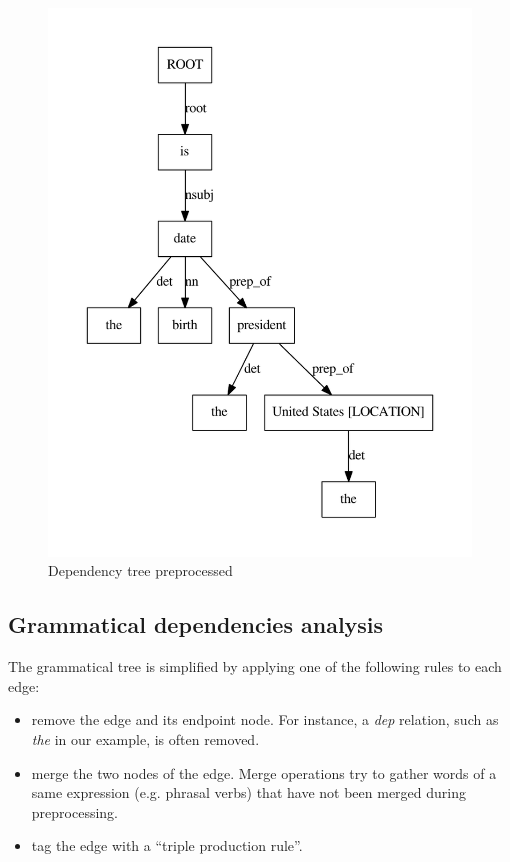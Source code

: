 \begin{figure}
  \centering
  \caption{Dependency tree preprocessed}
  \label{tree_two}
    \includegraphics[scale=0.6]{../examples_NLP_grammatical/tree2.pdf}
\end{figure}


\subsection{Grammatical dependencies analysis}

The grammatical tree is simplified by applying one of the following rules to each edge:
\begin{itemize}
 \item remove the edge and its endpoint node. For instance, a \textit{dep} relation, such as \textit{the} in our example, is often removed.
 \item merge the two nodes of the edge. Merge operations try to gather words of a same expression (e.g. phrasal verbs) that have not been merged during preprocessing.
 \item tag the edge with a ``triple production rule''.
\end{itemize}

